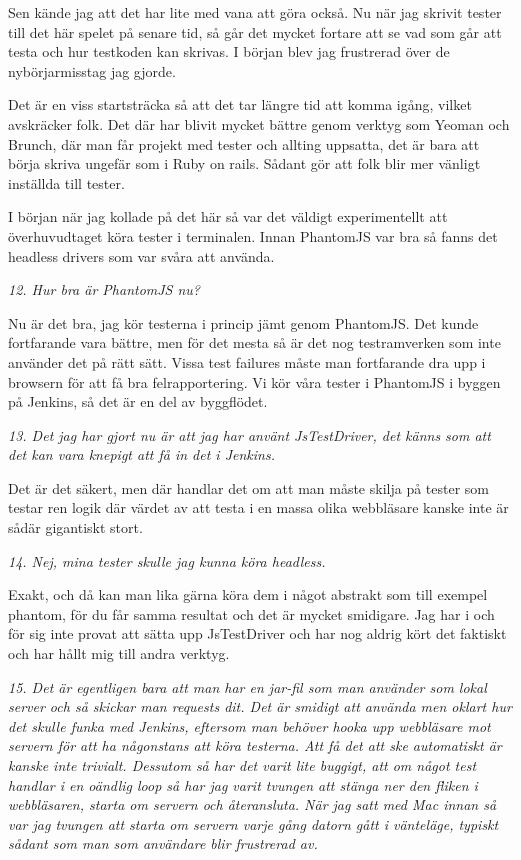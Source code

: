 \documentclass[11pt]{article}
\begin{document}
Sen kände jag att det har lite med vana att göra också. Nu när jag skrivit tester till det här spelet på senare tid, så går det mycket fortare att se vad som går att testa och hur testkoden kan skrivas. I början blev jag frustrerad över de nybörjarmisstag jag gjorde.

Det är en viss startsträcka så att det tar längre tid att komma igång, vilket avskräcker folk. Det där har blivit mycket bättre genom verktyg som Yeoman och Brunch, där man får projekt med tester och allting uppsatta, det är bara att börja skriva ungefär som i Ruby on rails. Sådant gör att folk blir mer vänligt inställda till tester.

I början när jag kollade på det här så var det väldigt experimentellt att överhuvudtaget köra tester i terminalen. Innan PhantomJS var bra så fanns det headless drivers som var svåra att använda.

\emph{12. Hur bra är PhantomJS nu?}

Nu är det bra, jag kör testerna i princip jämt genom PhantomJS. Det kunde fortfarande vara bättre, men för det mesta så är det nog testramverken som inte använder det på rätt sätt. Vissa test failures måste man fortfarande dra upp i browsern för att få bra felrapportering. Vi kör våra tester i PhantomJS i byggen på Jenkins, så det är en del av byggflödet.

\emph{13. Det jag har gjort nu är att jag har använt JsTestDriver, det känns som att det kan vara knepigt att få in det i Jenkins.}

Det är det säkert, men där handlar det om att man måste skilja på tester som testar ren logik där värdet av att testa i en massa olika webbläsare kanske inte är sådär gigantiskt stort.

\emph{14. Nej, mina tester skulle jag kunna köra headless.}

Exakt, och då kan man lika gärna köra dem i något abstrakt som till exempel phantom, för du får samma resultat och det är mycket smidigare. Jag har i och för sig inte provat att sätta upp JsTestDriver och har nog aldrig kört det faktiskt och har hållt mig till andra verktyg.

\emph{15. Det är egentligen bara att man har en jar-fil som man använder som lokal server och så skickar man requests dit. Det är smidigt att använda men oklart hur det skulle funka med Jenkins, eftersom man behöver hooka upp webbläsare mot servern för att ha någonstans att köra testerna. Att få det att ske automatiskt är kanske inte trivialt. Dessutom så har det varit lite buggigt, att om något test handlar i en oändlig loop så har jag varit tvungen att stänga ner den fliken i webbläsaren, starta om servern och återansluta. När jag satt med Mac innan så var jag tvungen att starta om servern varje gång datorn gått i vänteläge, typiskt sådant som man som användare blir frustrerad av.}
\end{document}
